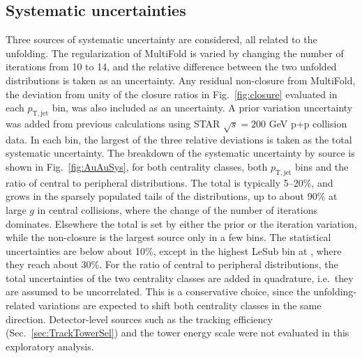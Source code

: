 \subsection{Systematic uncertainties}
Three sources of systematic uncertainty are considered, all related to the unfolding.
%
The regularization of MultiFold is varied by changing the number of iterations from 10 to 14, and the relative difference between the two unfolded distributions is taken as an uncertainty.
%
Any residual non-closure from MultiFold, the deviation from unity of the closure ratios in Fig.~\ref{fig:closure} evaluated in each \(p_\mathrm{T, jet}\) bin, was also included as an uncertainty.
%
A prior variation uncertainty was added from previous calculations using STAR $\sqrt{s} = 200$ GeV p+p collision data.
%
In each bin, the largest of the three relative deviations is taken as the total systematic uncertainty.
%
The breakdown of the systematic uncertainty by source is shown in Fig.~\ref{fig:AuAuSys}, for both centrality classes, both \(p_\mathrm{T, jet}\) bins and the ratio of central to peripheral distributions.
%
The total is typically 5--20\%, and grows in the sparsely populated tails of the distributions, up to about 90\% at large \(g\) in central collisions, where the change of the number of iterations dominates.
%
Elsewhere the total is set by either the prior or the iteration variation, while the non-closure is the largest source only in a few bins.
%
The statistical uncertainties are below about 10\%, except in the highest LeSub bin at , where they reach about 30\%.
%
For the ratio of central to peripheral distributions, the total uncertainties of the two centrality classes are added in quadrature, i.e.\ they are assumed to be uncorrelated. This is a conservative choice, since the unfolding-related variations are expected to shift both centrality classes in the same direction.
%
Detector-level sources such as the tracking efficiency (Sec.~\ref{sec:TrackTowerSel}) and the tower energy scale were not evaluated in this exploratory analysis.
